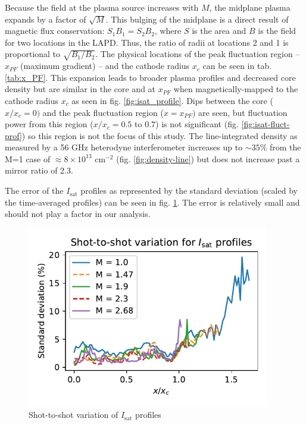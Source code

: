Because the field at the plasma source increases with $M$, the midplane plasma expands by a factor of $\sqrt{M}$. This bulging of the midplane is a direct result of magnetic flux conservation: $S_1 B_1 = S_2 B_2$, where $S$ is the area and $B$ is the field for two locations in the LAPD. Thus, the ratio of radii at locations 2 and 1 is proportional to $\sqrt{B_1/B_2}$. The physical locations of the peak fluctuation region -- $x_{PF}$ (maximum gradient) -- and the cathode radius $x_c$ can be seen in tab. \ref{tab:x_PF}. This expansion leads to broader plasma profiles and decreased core density but are similar in the core and at $x_{PF}$ when magnetically-mapped to the cathode radius $x_c$ as seen in fig. \ref{fig:isat_profile}. Dips between the core ($x/x_c=0)$ and the peak fluctuation region ($x=x_{PF})$ are seen, but fluctuation power from this region ($x/x_c = 0.5$ to $0.7$) is not significant (fig. \ref{fig:isat-fluct-prof}) so this region is not the focus of this study. The line-integrated density as measured by a 56 GHz heterodyne interferometer increases up to $\sim 35\%$ from the M=1 case of $\approx8 \times 10^{13}$ cm$^{-2}$ (fig. \ref{fig:density-line}) but does not increase past a mirror ratio of 2.3.

The error of the $I_\text{sat}$ profiles as represented by the standard deviation (scaled by the time-averaged profiles) can be seen in fig. \ref{fig_extra:isat-profile-stddev}. The error is relatively small and should not play a factor in our analysis.

\begin{figure}
    \centering
    \includegraphics[width=300pt]{figures/extra/isat-profile-stddev.pdf}
    \caption[Shot-to-shot variation of $I_\text{sat}$ profiles]{Shot-to-shot variation of $I_\text{sat}$ profiles}
    \label{fig_extra:isat-profile-stddev}
\end{figure}


